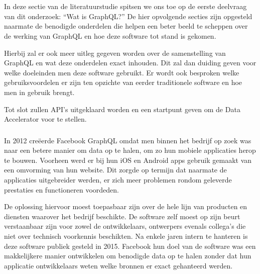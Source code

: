 \chapter{}%
\label{ch:stand-van-zaken}

\section{}%
\label{sec:GraphQL}

In deze sectie van de literatuurstudie spitsen we ons toe op de eerste deelvraag van dit onderzoek: “Wat is GraphQL?”
De hier opvolgende secties zijn opgesteld naarmate de benodigde onderdelen die helpen een beter beeld te scheppen over de werking van GraphQL en hoe deze software tot stand is gekomen.

Hierbij zal er ook meer uitleg gegeven worden over de samenstelling van GraphQL en wat deze onderdelen exact inhouden. Dit zal dan duiding geven voor welke doeleinden men deze software gebruikt. Er wordt ook besproken welke gebruiksvoordelen er zijn ten opzichte van eerder traditionele software en hoe men in gebruik brengt.

Tot slot zullen API's uitgeklaard worden en een startpunt geven om de Data Accelerator voor te stellen.

\subsection{}%
\label{sec:Gegevens ophalen}
In 2012 creëerde Facebook GraphQL omdat men binnen het bedrijf op zoek was naar een betere manier om data op te halen, om zo hun mobiele applicaties herop te bouwen. Voorheen werd er bij hun iOS en Android apps gebruik gemaakt van een omvorming van hun website. Dit zorgde op termijn dat naarmate de applicaties uitgebreider werden, er zich meer problemen rondom geleverde prestaties en functioneren voordeden.

 De oplossing hiervoor moest toepasbaar zijn over de hele lijn van producten en diensten waarover het bedrijf beschikte. De software zelf moest op zijn beurt verstaanbaar zijn voor zowel de ontwikkelaars, ontwerpers evenals collega’s die niet over technisch voorkennis beschikten. Na enkele jaren intern te hanteren is deze software publiek gesteld in 2015. Facebook hun doel van de software was een makkelijkere manier ontwikkelen om benodigde data op te halen zonder dat hun applicatie ontwikkelaars weten welke bronnen er exact gehanteerd werden.\autocite{GraphQLFoundation2022}

